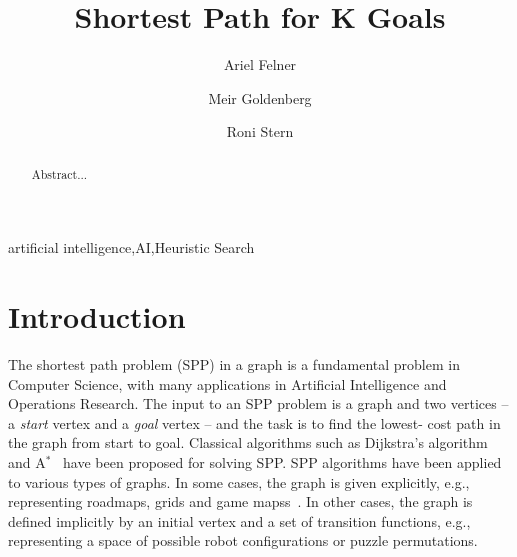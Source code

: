 \documentclass{aicom2e}
\newcommand{\astar}{A$^*$}
\begin{document}
\begin{frontmatter}                           %
%
\title{Shortest Path for K Goals}
\maketitle
%
\author[]{Ariel Felner}
\address{Ben Gurion University of the Negev\\ Be'er Sheva, Israel\\
    E-mail: felner@bgu.ac.il}

\author[]{Meir Goldenberg}
\address{The Jerusalem College of Technology\\ Jerusalem, Israel\\
    E-mail: mgoldenbe@gmail.com}
\author[]{Roni Stern}
\address{Ben Gurion University of the Negev\\ Be'er Sheva, Israel\\
    E-mail: roni.stern@gmail.com}

\begin{abstract}
Abstract...

\end{abstract}

\begin{keyword}
artificial intelligence\sep AI\sep Heuristic Search
\end{keyword}
%
\end{frontmatter}

\section*{Introduction}

The shortest path problem (SPP) in a graph is a fundamental problem in Computer Science, with many applications in Artificial Intelligence and Operations Research. The input to an SPP problem is a graph and two vertices -- a {\em start} vertex and a {\em goal} vertex -- and the task is to find the lowest- cost path in the graph from start to goal. 
Classical algorithms such as Dijkstra's algorithm~\cite{DIJ59} and \astar{}~\cite{hartNR68Astar} have been proposed for solving SPP. 
SPP algorithms have been applied to various types of graphs. In some cases, the graph is given explicitly, e.g., representing roadmaps, grids and game mapss~\cite{sturtevant2012benchmarks}. In other cases, the graph is defined implicitly by an initial vertex and a set of transition functions, e.g., representing a space of possible robot configurations or puzzle permutations. 
\end{document}
